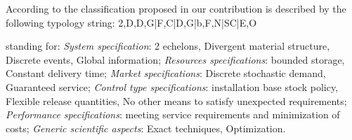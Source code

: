\documentclass[ijoc,sglanonrev]{informs4}
\begin{document}
According to the classification proposed in \cite{DEKOK2018} our contribution is described by the following typology string: 2,D,D,G|F,C|D,G|b,F,N|SC|E,O

\noindent standing for: {\it System specification}: 2 echelons, Divergent material structure, Discrete events, Global information; {\it Resources specifications}: bounded storage, Constant delivery time; {\it Market specifications}: Discrete stochastic demand, Guaranteed service; {\it Control type specifications}: installation base stock policy, Flexible release quantities, No other means to satisfy unexpected requirements; {\it Performance specifications}: meeting service requirements and minimization of costs; {\it Generic scientific aspects}: Exact techniques, Optimization.




\end{document}
